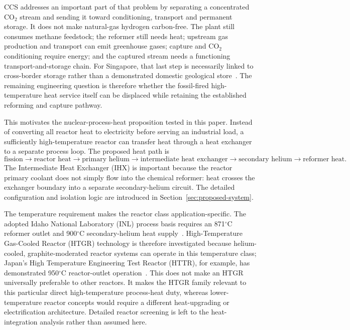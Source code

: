 CCS addresses an important part of that problem by separating a concentrated CO$_2$ stream and sending it toward conditioning, transport and permanent storage. It does not make natural-gas hydrogen carbon-free. The plant still consumes methane feedstock; the reformer still needs heat; upstream gas production and transport can emit greenhouse gases; capture and CO$_2$ conditioning require energy; and the captured stream needs a functioning transport-and-storage chain. For Singapore, that last step is necessarily linked to cross-border storage rather than a demonstrated domestic geological store~\cite{mti2025carbon,mti2025indonesiaccs}. The remaining engineering question is therefore whether the fossil-fired high-temperature heat service itself can be displaced while retaining the established reforming and capture pathway.

This motivates the nuclear-process-heat proposition tested in this paper. Instead of converting all reactor heat to electricity before serving an industrial load, a sufficiently high-temperature reactor can transfer heat through a heat exchanger to a separate process loop. The proposed heat path is
\[
\text{fission}\rightarrow\text{reactor heat}\rightarrow\text{primary helium}
\rightarrow\text{intermediate heat exchanger}\rightarrow\text{secondary helium}
\rightarrow\text{reformer heat}.
\]
The Intermediate Heat Exchanger (IHX) is important because the reactor primary coolant does not simply flow into the chemical reformer: heat crosses the exchanger boundary into a separate secondary-helium circuit. The detailed configuration and isolation logic are introduced in Section~\ref{sec:proposed-system}.

The temperature requirement makes the reactor class application-specific. The adopted Idaho National Laboratory (INL) process basis requires an 871$^\circ$C reformer outlet and 900$^\circ$C secondary-helium heat supply~\cite{inltev953,inltev961}. High-Temperature Gas-Cooled Reactor (HTGR) technology is therefore investigated because helium-cooled, graphite-moderated reactor systems can operate in this temperature class; Japan's High Temperature Engineering Test Reactor (HTTR), for example, has demonstrated 950$^\circ$C reactor-outlet operation~\cite{jaeahttr}. This does not make an HTGR universally preferable to other reactors. It makes the HTGR family relevant to this particular direct high-temperature process-heat duty, whereas lower-temperature reactor concepts would require a different heat-upgrading or electrification architecture. Detailed reactor screening is left to the heat-integration analysis rather than assumed here.

